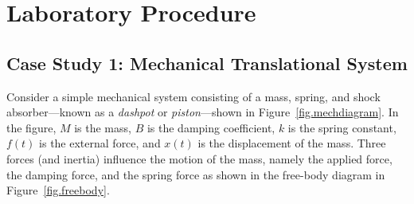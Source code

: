 \section{Laboratory Procedure}

\subsection{Case Study 1: Mechanical Translational System} \label{cs.mechtrans}
Consider a simple mechanical system consisting of a mass, spring, and shock absorber---known as a \textit{dashpot} or \textit{piston}---shown in Figure~\ref{fig.mechdiagram}.  In the figure, $M$ is the mass, $B$ is the damping coefficient, $k$ is the spring constant, $f(t)$ is the external force, and $x(t)$ is the displacement of the mass.  Three forces (and inertia) influence the motion of the mass, namely the applied force, the damping force, and the spring force as shown in the free-body diagram in Figure~\ref{fig.freebody}.

\newsavebox{\tempbigA}
\newsavebox{\tempsmallA}
\begin{figure}[bht]
    \centering
    \newlength{\subfigoffsetA}
    \setlength{\subfigoffsetA}{0.5\ht\tempbigA}
    \addtolength{\subfigoffsetA}{-0.5\ht\tempsmallA}
    \hfill
    \caption{}
\end{figure}

